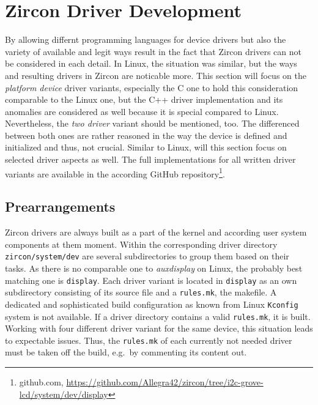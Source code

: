 
\section{Zircon Driver Development}\label{sec:cs-zircon}
By allowing differnt programming languages for device drivers but also the variety of available and legit ways result in the fact that Zircon drivers can not be considered in each detail.
In Linux, the situation was similar, but the ways and resulting drivers in Zircon are noticable more.
This section will focus on the \textit{platform device} driver variants, especially the C one to hold this consideration comparable to the Linux one, but the C++ driver implementation and its anomalies are considered as well because it is special compared to Linux.
Nevertheless, the \textit{two driver} variant should be mentioned, too.
The differenced between both ones are rather reasoned in the way the device is defined and initialized and thus, not crucial.
Similar to Linux, will this section focus on selected driver aspects as well.
The full implementations for all written driver variants are available in the according GitHub repository\footnote{github.com, \url{https://github.com/Allegra42/zircon/tree/i2c-grove-lcd/system/dev/display}}.

\subsection{Prearrangements}
Zircon drivers are always built as a part of the kernel and according user system components at them moment.
Within the corresponding driver directory \texttt{zircon/system/dev} are several subdirectories to group them based on their tasks.
As there is no comparable one to \textit{auxdisplay} on Linux, the probably best matching one is \texttt{display}.
Each driver variant is located in \texttt{display} as an own subdirectory consisting of its source file and a \texttt{rules.mk}, the makefile.
A dedicated and sophisticated build configuration as known from Linux \texttt{Kconfig} system is not available.
If a driver directory contains a valid \texttt{rules.mk}, it is built.
Working with four different driver variant for the same device, this situation leads to expectable issues.
Thus, the \texttt{rules.mk} of each currently not needed driver must be taken off the build, e.g.\ by commenting its content out.

